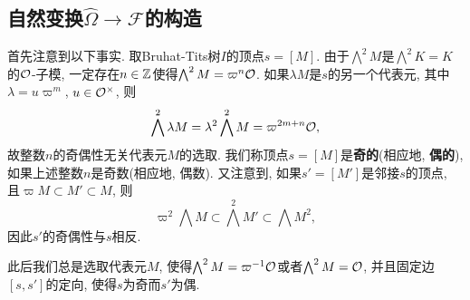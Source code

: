 \subsection{自然变换$\hat{\Omega}\to\mathcal{F}$的构造}

首先注意到以下事实.
取Bruhat-Tits树$I$的顶点$s = [M]$. 由于$\bigwedge^2 M$是$\bigwedge^2 K = K$的$\mathcal{O}$-子模, 一定存在$n\in\mathbb{Z}$使得$\bigwedge^2 M = \varpi^n\mathcal{O}$.
如果$\lambda M$是$s$的另一个代表元, 其中$\lambda = u\varpi^m$, $u\in\mathcal{O}^\times$, 则\[\bigwedge^2 \lambda M = \lambda^2\bigwedge^2 M = \varpi^{2m+n}\mathcal{O},\]
故整数$n$的奇偶性无关代表元$M$的选取.
我们称顶点$s = [M]$是\textbf{奇的}(相应地, \textbf{偶的}), 如果上述整数$n$是奇数(相应地, 偶数).
又注意到, 如果$s' = [M']$是邻接$s$的顶点, 且$\varpi M\subset M'\subset M$, 则\[\varpi^2\bigwedge M\subset\bigwedge^2 M'\subset\bigwedge M^2,\]
因此$s'$的奇偶性与$s$相反.

此后我们总是选取代表元$M$, 使得$\bigwedge^2 M = \varpi^{-1}\mathcal{O}$或者$\bigwedge^2 M = \mathcal{O}$,
并且固定边$[s, s']$的定向, 使得$s$为奇而$s'$为偶.


